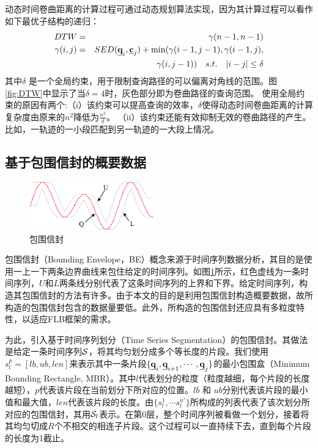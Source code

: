 动态时间卷曲距离的计算过程可通过动态规划算法实现，因为其计算过程可以看作如下最优子结构的递归：
\begin{eqnarray}\label{eq:dtwdef}
DTW&=&\gamma(n-1,n-1) \\ \nonumber
\gamma(i,j)&=&SED(\emph{{\textbf{q}}}_{i}, \emph{{\textbf{c}}}_{j}) + \min(\gamma(i-1,j-1), \gamma(i-1,j), \nonumber \\
&&\gamma(i,j-1))  \quad s.t.  \quad |i-j| \le \delta
\end{eqnarray}
其中$\delta$ 是一个全局约束，用于限制查询路径的可以偏离对角线的范围。图\ref{fig:DTW}中显示了当$\delta=4$时，灰色部分即为卷曲路径的查询范围。
使用全局约束的原因有两个:（i）该约束可以提高查询的效率，$\delta$使得动态时间卷曲距离的计算复杂度由原来的$n^2$降低为$\frac{n^2}{\delta}$。
（ii）该约束还能有效抑制无效的卷曲路径的产生。比如，一轨迹的一小段匹配到另一轨迹的一大段上情况。


\subsection{基于包围信封的概要数据}\label{sec-c5-BE}
\begin{figure}[t]
	\centering
	\includegraphics[width=0.48\textwidth]{Fig/chapter5/BE}
	\caption{包围信封}
	\label{fig:BE}
\end{figure}
包围信封（Bounding Envelope，BE）概念来源于时间序列数据分析，其目的是使用一上一下两条边界曲线来包住给定的时间序列。如图\ref{fig:BE}所示，红色虚线为一条时间序列，$U$和$L$两条线分别代表了这条时间序列的上界和下界。给定时间序列，构造其包围信封的方法有许多。由于本文的目的是利用包围信封构造概要数据，故所构造的包围信封包含的数据量要低。此外，所构造的包围信封还应具有多粒度特性，以适应FLB框架的需求。

为此，引入基于时间序列划分（Time Series Segmentation）的包围信封。其做法是给定一条时间序列$\cal S$，将其均匀划分成多个等长度的片段。我们使用$s_{l}^{p}= {[lb, ub, len]}$来表示其中一条片段$\{\emph{{\textbf{q}}}_{i}, \emph{{\textbf{q}}}_{i+1}, \cdots, \emph{{\textbf{q}}}_{j} \}$的最小包围盒（Minimum Bounding Rectangle, MBR）。其中$l$代表划分的粒度（粒度越细，每个片段的长度越短），$p$代表该片段在当前划分下所对应的位置。$lb$ 和 $ub$分别代表该片段的最小值和最大值，$len$代表该片段的长度。由$\{s_{l}^{1}, \cdots s_{l}^{n'}\}$所构成的列表代表了该次划分所对应的包围信封，其用${\cal S}_{l}$表示。在第0层，整个时间序列被看做一个划分，接着将其均匀切成$R$个不相交的相连子片段。这个过程可以一直持续下去，直到每个片段的长度为1截止。

